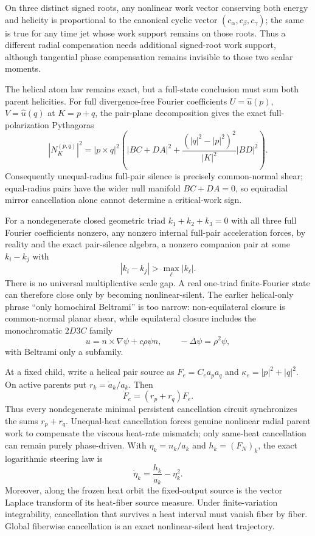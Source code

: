 \documentclass[11pt]{article}
\begin{document}
On three distinct signed roots, any nonlinear work vector conserving both energy and helicity is proportional to the canonical cyclic vector $(c_\alpha,c_\beta,c_\gamma)$; the same is true for any time jet whose work support remains on those roots.  Thus a different radial compensation needs additional signed-root work support, although tangential phase compensation remains invisible to those two scalar moments.

The helical atom law remains exact, but a full-state conclusion must sum both parent helicities.  For full divergence-free Fourier coefficients $U=\widehat u(p)$, $V=\widehat u(q)$ at $K=p+q$, the pair-plane decomposition gives the exact full-polarization Pythagoras
\[
|N_K^{(p,q)}|^2
=|p\times q|^2\left(
|BC+DA|^2
+\frac{(|q|^2-|p|^2)^2}{|K|^2}|BD|^2
\right).
\]
Consequently unequal-radius full-pair silence is precisely common-normal shear; equal-radius pairs have the wider null manifold $BC+DA=0$, so equiradial mirror cancellation alone cannot determine a critical-work sign.

For a nondegenerate closed geometric triad $k_1+k_2+k_3=0$ with all three full Fourier coefficients nonzero, any nonzero internal full-pair acceleration forces, by reality and the exact pair-silence algebra, a nonzero companion pair at some $k_i-k_j$ with
\[
|k_i-k_j|>\max_\ell |k_\ell|.
\]
There is no universal multiplicative scale gap.  A real one-triad finite-Fourier state can therefore close only by becoming nonlinear-silent.  The earlier helical-only phrase ``only homochiral Beltrami'' is too narrow: non-equilateral closure is common-normal planar shear, while equilateral closure includes the monochromatic $2D3C$ family
\[
u=n\times\nabla\psi+c\rho\psi n,
\qquad -\Delta\psi=\rho^2\psi,
\]
with Beltrami only a subfamily.

At a fixed child, write a helical pair source as $F_e=C_ea_pa_q$ and $\kappa_e=|p|^2+|q|^2$.  On active parents put $r_k=\dot a_k/a_k$.  Then
\[
\dot F_e=(r_p+r_q)F_e.
\]
Thus every nondegenerate minimal persistent cancellation circuit synchronizes the sums $r_p+r_q$.  Unequal-heat cancellation forces genuine nonlinear radial parent work to compensate the viscous heat-rate mismatch; only same-heat cancellation can remain purely phase-driven.  With $\eta_k=n_k/a_k$ and $h_k=(F_N)_k$, the exact logarithmic steering law is
\[
\dot\eta_k=\frac{h_k}{a_k}-\eta_k^2.
\]
Moreover, along the frozen heat orbit the fixed-output source is the vector Laplace transform of its heat-fiber source measure.  Under finite-variation integrability, cancellation that survives a heat interval must vanish fiber by fiber.  Global fiberwise cancellation is an exact nonlinear-silent heat trajectory.
\end{document}
